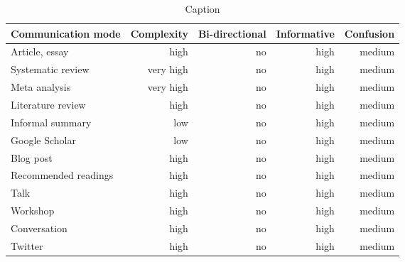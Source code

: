 \begin{table*}\centering
{}
\begin{tabular}{@{}lrrrr@{}}\toprule
Communication mode & Complexity & Bi-directional & Informative  & Confusion
\\\midrule
Article, essay      & high & no & high & medium  \\
Systematic review   & very high & no & high & medium\\
Meta analysis       & very high & no & high & medium\\
Literature review   & high & no & high & medium\\
Informal summary    & low & no & high & medium\\
Google Scholar      & low & no & high & medium\\
Blog post           & high & no & high & medium\\
Recommended readings& high & no & high & medium\\
Talk                & high & no & high & medium\\
Workshop            & high & no & high & medium\\
Conversation        & high & no & high & medium\\
Twitter             & high & no & high & medium\\
\bottomrule
\end{tabular}
\caption{Caption}
\end{table*}